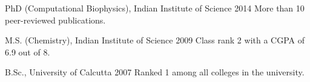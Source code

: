 


\begin{cventries}


\eduentry
{} %
{PhD (Computational Biophysics), Indian Institute of Science} %
{2014} %
{} %
{ %
More than 10 peer-reviewed publications.
}

\eduentry
{} %
{M.S. (Chemistry), Indian Institute of Science} %
{2009} %
{} %
{ %
Class rank 2 with a CGPA of 6.9 out of 8.
}

\eduentry
{} %
{B.Sc., University of Calcutta} %
{2007} %
{} %
{ %
Ranked 1 among all colleges in the university.
}


\end{cventries}
